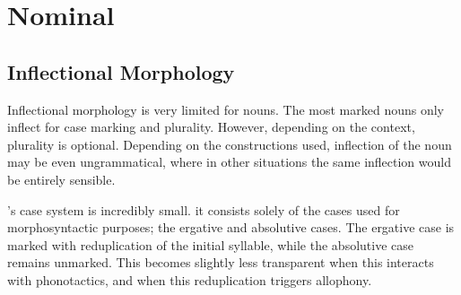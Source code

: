 \chapter{Nominal}\label{ch:morpho-nom}
\section{Inflectional Morphology}\label{sec:morpho-nom-inf}
Inflectional morphology is very limited for nouns. The most marked nouns only inflect for case marking and plurality. However, depending on the context, plurality is optional. Depending on the constructions used, inflection of the noun may be even ungrammatical, where in other situations the same inflection would be entirely sensible.

\langname 's case system is incredibly small. it consists solely of the cases used for morphosyntactic purposes; the ergative and absolutive cases. The ergative case is marked with reduplication of the initial syllable, while the absolutive case remains unmarked. This becomes slightly less transparent when this interacts with phonotactics, and when this reduplication triggers allophony.